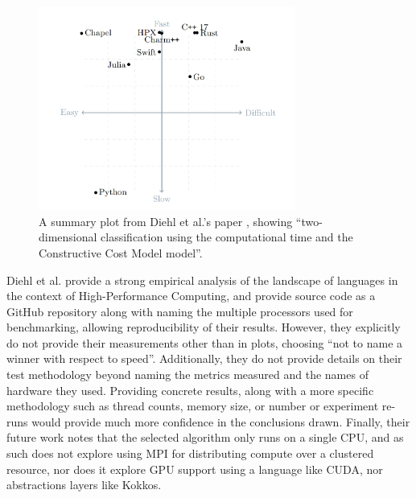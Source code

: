 \begin{figure}[H]
    \centering
    \includegraphics[width=0.75\textwidth]{images/2_background/1d_heat_results.png}
    \caption{A summary plot from Diehl et al.'s paper \cite{diehlBenchmarkingParallel1D2023}, showing ``two-dimensional classification using the computational time and the Constructive Cost Model model''.}
    \label{fig:1d_heat_results}
\end{figure}

Diehl et al. provide a strong empirical analysis of the landscape of languages in the context of High-Performance Computing, and provide source code as a GitHub repository \cite{} along with naming the multiple processors used for benchmarking, allowing reproducibility of their results. However, they explicitly do not provide their measurements other than in plots, choosing ``not to name a winner with respect to speed''. Additionally, they do not provide details on their test methodology beyond naming the metrics measured and the names of hardware they used. Providing concrete results, along with a more specific methodology such as thread counts, memory size, or number or experiment re-runs would provide much more confidence in the conclusions drawn. %
Finally, their future work notes that the selected algorithm only runs on a single CPU, and as such does not explore using MPI for distributing compute over a clustered resource, nor does it explore GPU support using a language like CUDA, nor abstractions layers like Kokkos.

